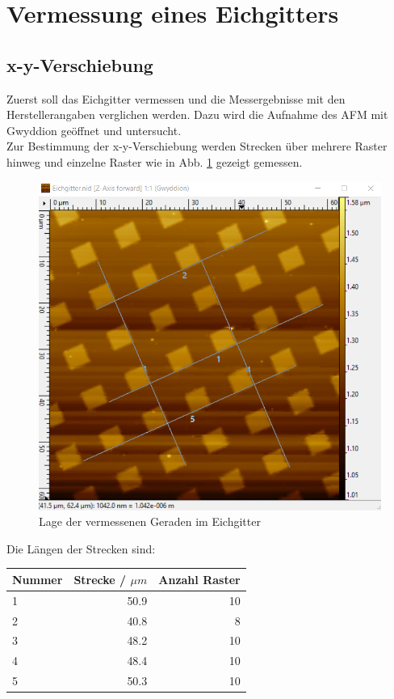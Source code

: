 

\section{Vermessung eines Eichgitters}
\subsection{x-y-Verschiebung}
Zuerst soll das Eichgitter vermessen und die Messergebnisse mit den Herstellerangaben verglichen werden. Dazu wird die Aufnahme des AFM mit 
Gwyddion \footnotemark {} geöffnet und untersucht.\\
Zur Bestimmung der x-y-Verschiebung werden Strecken über mehrere Raster hinweg und einzelne Raster wie in Abb. \ref{bild:EichWo} gezeigt 
gemessen. 

\begin{figure}[h]
    \centering
    \includegraphics[scale = 0.5]{Bilder/EichGeraden.png}
    \caption{Lage der vermessenen Geraden im Eichgitter}
    \label{bild:EichWo}
\end{figure}
\newpage

Die Längen der Strecken sind:

\begin{center}
    \centering
    \begin{tabular}{l|r r}
        Nummer & Strecke / $\mu m$ & Anzahl Raster \\
        \hline
        1 & 50.9 & 10\\
        2 & 40.8 & 8\\
        3 & 48.2 & 10 \\
        4 & 48.4 & 10 \\
        5 & 50.3 & 10\\
        
    \end{tabular}
\end{center}

